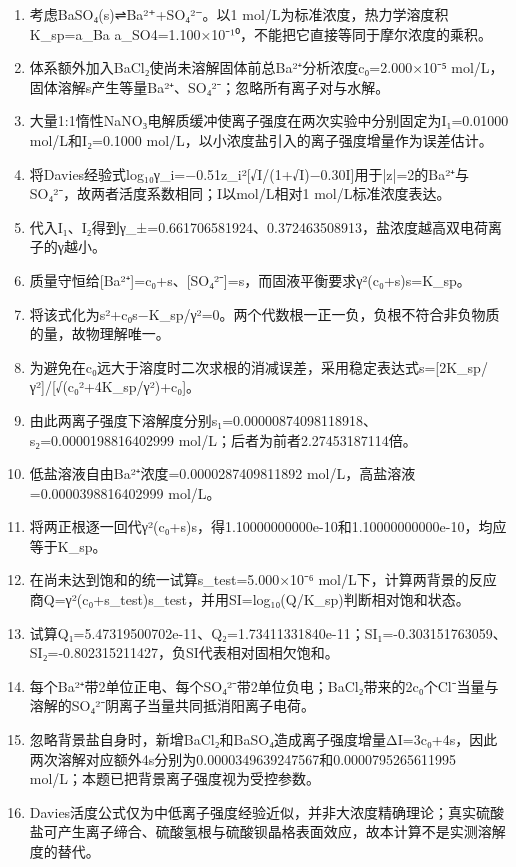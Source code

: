 \documentclass[UTF8,11pt,a4paper]{ctexart}
\begin{document}
\begin{enumerate}
\item 考虑BaSO₄(s)⇌Ba²⁺+SO₄²⁻。以1 mol/L为标准浓度，热力学溶度积K\_sp=a\_Ba a\_SO4=1.100×10⁻¹⁰，不能把它直接等同于摩尔浓度的乘积。
\item 体系额外加入BaCl₂使尚未溶解固体前总Ba²⁺分析浓度c₀=2.000×10⁻⁵ mol/L，固体溶解s产生等量Ba²⁺、SO₄²⁻；忽略所有离子对与水解。
\item 大量1:1惰性NaNO₃电解质缓冲使离子强度在两次实验中分别固定为I₁=0.01000 mol/L和I₂=0.1000 mol/L，以小浓度盐引入的离子强度增量作为误差估计。
\item 将Davies经验式log₁₀γ\_i=−0.51z\_i²[√I/(1+√I)−0.30I]用于|z|=2的Ba²⁺与SO₄²⁻，故两者活度系数相同；I以mol/L相对1 mol/L标准浓度表达。
\item 代入I₁、I₂得到γ\_±=0.661706581924、0.372463508913，盐浓度越高双电荷离子的γ越小。
\item 质量守恒给[Ba²⁺]=c₀+s、[SO₄²⁻]=s，而固液平衡要求γ²(c₀+s)s=K\_sp。
\item 将该式化为s²+c₀s−K\_sp/γ²=0。两个代数根一正一负，负根不符合非负物质的量，故物理解唯一。
\item 为避免在c₀远大于溶度时二次求根的消减误差，采用稳定表达式s=[2K\_sp/γ²]/[√(c₀²+4K\_sp/γ²)+c₀]。
\item 由此两离子强度下溶解度分别s₁=0.00000874098118918、s₂=0.0000198816402999 mol/L；后者为前者2.27453187114倍。
\item 低盐溶液自由Ba²⁺浓度=0.0000287409811892 mol/L，高盐溶液=0.0000398816402999 mol/L。
\item 将两正根逐一回代γ²(c₀+s)s，得1.10000000000e-10和1.10000000000e-10，均应等于K\_sp。
\item 在尚未达到饱和的统一试算s\_test=5.000×10⁻⁶ mol/L下，计算两背景的反应商Q=γ²(c₀+s\_test)s\_test，并用SI=log₁₀(Q/K\_sp)判断相对饱和状态。
\item 试算Q₁=5.47319500702e-11、Q₂=1.73411331840e-11；SI₁=-0.303151763059、SI₂=-0.802315211427，负SI代表相对固相欠饱和。
\item 每个Ba²⁺带2单位正电、每个SO₄²⁻带2单位负电；BaCl₂带来的2c₀个Cl⁻当量与溶解的SO₄²⁻阴离子当量共同抵消阳离子电荷。
\item 忽略背景盐自身时，新增BaCl₂和BaSO₄造成离子强度增量ΔI=3c₀+4s，因此两次溶解对应额外4s分别为0.0000349639247567和0.0000795265611995 mol/L；本题已把背景离子强度视为受控参数。
\item Davies活度公式仅为中低离子强度经验近似，并非大浓度精确理论；真实硫酸盐可产生离子缔合、硫酸氢根与硫酸钡晶格表面效应，故本计算不是实测溶解度的替代。
\end{enumerate}
\end{document}
